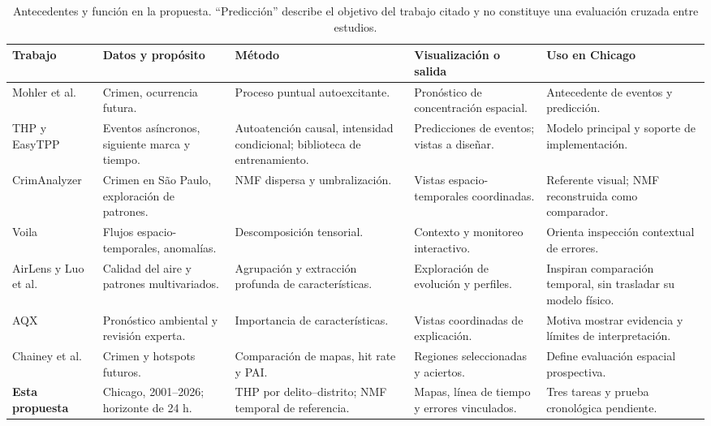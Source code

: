 \documentclass[10pt,a4paper,twocolumn]{article}
\begin{document}
\begin{table}[t]
\centering
\caption{Antecedentes y función en la propuesta. ``Predicción'' describe el objetivo del trabajo citado y no constituye una evaluación cruzada entre estudios.}
\label{tab:relacionados}
\small
\setlength{\tabcolsep}{4.3pt}
\renewcommand{\arraystretch}{1.13}
\begin{tabularx}{\textwidth}{@{}>{\raggedright\arraybackslash}p{2.5cm}YYYY@{}}
\toprule
\textbf{Trabajo} & \textbf{Datos y propósito} & \textbf{Método} & \textbf{Visualización o salida} & \textbf{Uso en Chicago}\\
\midrule
Mohler et al. \cite{mohler2011crime} & Crimen, ocurrencia futura. & Proceso puntual autoexcitante. & Pronóstico de concentración espacial. & Antecedente de eventos y predicción.\\
\addlinespace
THP \cite{zuo2020thp} y EasyTPP \cite{xue2024easytpp} & Eventos asíncronos, siguiente marca y tiempo. & Autoatención causal, intensidad condicional; biblioteca de entrenamiento. & Predicciones de eventos; vistas a diseñar. & Modelo principal y soporte de implementación.\\
\addlinespace
CrimAnalyzer \cite{garcia2021crimanalyzer} & Crimen en São Paulo, exploración de patrones. & NMF dispersa y umbralización. & Vistas espacio-temporales coordinadas. & Referente visual; NMF reconstruida como comparador.\\
\addlinespace
Voila \cite{cao2018voila} & Flujos espacio-temporales, anomalías. & Descomposición tensorial. & Contexto y monitoreo interactivo. & Orienta inspección contextual de errores.\\
\addlinespace
AirLens \cite{qu2022airlens} y Luo et al. \cite{luo2024airquality} & Calidad del aire y patrones multivariados. & Agrupación y extracción profunda de características. & Exploración de evolución y perfiles. & Inspiran comparación temporal, sin trasladar su modelo físico.\\
\addlinespace
AQX \cite{velumani2022aqx} & Pronóstico ambiental y revisión experta. & Importancia de características. & Vistas coordinadas de explicación. & Motiva mostrar evidencia y límites de interpretación.\\
\addlinespace
Chainey et al. \cite{chainey2008utility} & Crimen y hotspots futuros. & Comparación de mapas, hit rate y PAI. & Regiones seleccionadas y aciertos. & Define evaluación espacial prospectiva.\\
\addlinespace
\textbf{Esta propuesta} & Chicago, 2001--2026; horizonte de 24 h. & THP por delito--distrito; NMF temporal de referencia. & Mapas, línea de tiempo y errores vinculados. & Tres tareas y prueba cronológica pendiente.\\
\bottomrule
\end{tabularx}
\end{table}
\end{document}
